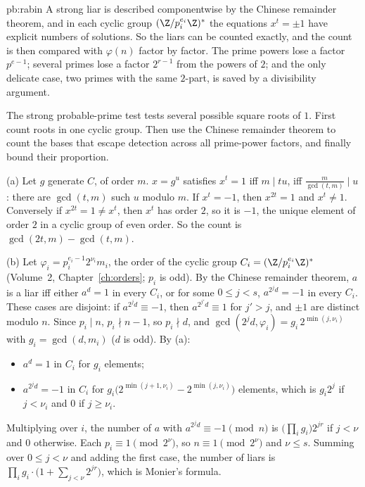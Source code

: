 \begin{solution}{pb:rabin}
\idea A strong liar is described componentwise by the Chinese remainder theorem, and in each cyclic group $(\Z/p_i^{e_i}\Z)^*$
the equations $x^t=\pm1$ have explicit numbers of solutions. So the liars can be counted exactly, and the count is then
compared with $\varphi(n)$ factor by factor. The prime powers lose a factor $p^{e-1}$; several primes lose a factor
$2^{r-1}$ from the powers of $2$; and the only delicate case, two primes with the same $2$-part, is saved by a
divisibility argument.

\writeup
The strong probable-prime test tests several possible square roots of $1$. First count roots in one cyclic group. Then use the Chinese remainder theorem to count the bases that escape detection across all prime-power factors, and finally bound their proportion.

 (a) Let $g$ generate $C$, of order $m$. $x=g^u$ satisfies $x^t=1$ iff $m\mid tu$, iff $\frac m{\gcd(t,m)}\mid u$: there are
$\gcd(t,m)$ such $u$ modulo $m$. If $x^t=-1$, then $x^{2t}=1$ and $x^t\ne1$. Conversely if $x^{2t}=1\ne x^t$, then $x^t$ has order $2$,
so it is $-1$, the unique element of order $2$ in a cyclic group of even order. So the count is $\gcd(2t,m)-\gcd(t,m)$.

(b) Let $\varphi_i=p_i^{e_i-1}2^{\nu_i}m_i$, the order of the cyclic group $C_i=(\Z/p_i^{e_i}\Z)^*$ (Volume~2, Chapter~\ref{ch:orders}; $p_i$ is odd).
By the Chinese remainder theorem, $a$ is a liar iff either $a^d=1$ in every $C_i$, or for some $0\le j<s$, $a^{2^jd}=-1$ in every
$C_i$. These cases are disjoint: if $a^{2^jd}\equiv-1$, then $a^{2^{j'}d}\equiv1$ for $j'>j$, and $\pm1$ are distinct modulo $n$. Since
$p_i\mid n$, $p_i\nmid n-1$, so $p_i\nmid d$, and $\gcd(2^jd,\varphi_i)=g_i\,2^{\min(j,\nu_i)}$ with $g_i=\gcd(d,m_i)$ ($d$ is odd). By (a):
\begin{itemize}
\item $a^d=1$ in $C_i$ for $g_i$ elements;
\item $a^{2^jd}=-1$ in $C_i$ for $g_i\bigl(2^{\min(j+1,\nu_i)}-2^{\min(j,\nu_i)}\bigr)$ elements, which is $g_i2^j$ if $j<\nu_i$ and $0$ if
$j\ge\nu_i$.
\end{itemize}
Multiplying over $i$, the number of $a$ with $a^{2^jd}\equiv-1\pmod n$ is $\bigl(\prod_ig_i\bigr)2^{jr}$ if $j<\nu$ and $0$ otherwise.
Each $p_i\equiv1\pmod{2^\nu}$, so $n\equiv1\pmod{2^\nu}$ and $\nu\le s$. Summing over $0\le j<\nu$ and adding the first case, the
number of liars is $\prod_ig_i\cdot\bigl(1+\sum_{j<\nu}2^{jr}\bigr)$, which is Monier's formula.


\end{solution}
